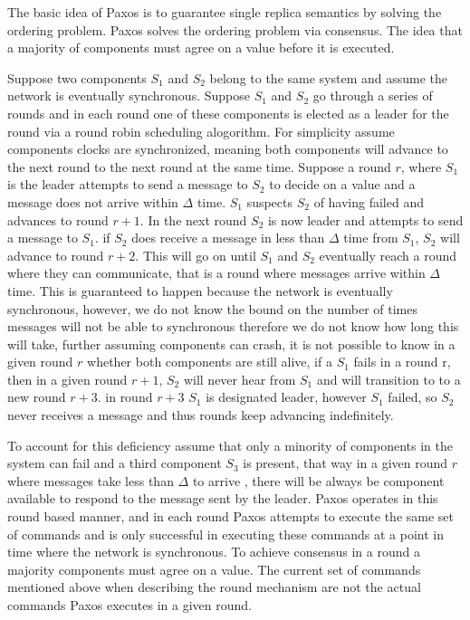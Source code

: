 \documentclass[conference]{IEEEtran}
\begin{document}
The basic idea of Paxos is to guarantee single replica semantics by solving the ordering problem. Paxos solves the ordering problem via consensus. The idea that a majority of components must agree on a value before it is executed. 

Suppose two components \(S_1\) and \(S_2\) belong to the same system and assume the network is eventually synchronous. Suppose \(S_1\) and \(S_2\) go through a series of rounds and in each round one of these components is elected as a leader for the round via a round robin scheduling alogorithm. For simplicity assume components clocks are synchronized, meaning both components will advance to the next round to the next round at the same time. Suppose a round \(r\), where \(S_1\) is the leader attempts to send a message to \(S_2\) to decide on a value and a message does not arrive within $\Delta$ time. \(S_1\) suspects \(S_2\) of having failed and advances to round \(r+1\). In the next round \(S_2\) is now leader and attempts to send a message to \(S_1\). if \(S_2\) does receive a message in less than $\Delta$ time from \(S_1\), \(S_2\) will advance to round \(r+2\). This will go on until \(S_1\) and \(S_2\) eventually reach a round where they can communicate, that is a round where messages arrive within $\Delta$ time. This is guaranteed to happen because the network is eventually synchronous, however, we do not know the bound on the number of times messages will not be able to synchronous therefore we do not know how long this will take, further assuming components can crash, it is not possible to know in a given round \(r\) whether both components are still alive, if a \(S_1\) fails in a round r, then in a given round \(r + 1\), \(S_2\) will never hear from \(S_1\) and will transition to to a new round \(r+3\). in round \(r+3\) \(S_1\) is designated leader, however \(S_1\) failed, so \(S_2\) never receives a message and thus rounds keep advancing indefinitely. 

To account for this deficiency assume that only a minority of components in the system can fail and a third component \(S_3\) is present, that way in a given round \(r\) where messages take less than $\Delta$ to arrive , there will be always be  component available to respond to the message sent by the leader. Paxos operates in this round based manner, and in each round Paxos attempts to execute the same set of commands and is only successful in executing these commands at a point in time where the network is synchronous. To achieve consensus in a round a majority components must agree on a value. The current set of commands mentioned above when describing the round mechanism are not the actual commands Paxos executes in a given round. 
\end{document}
